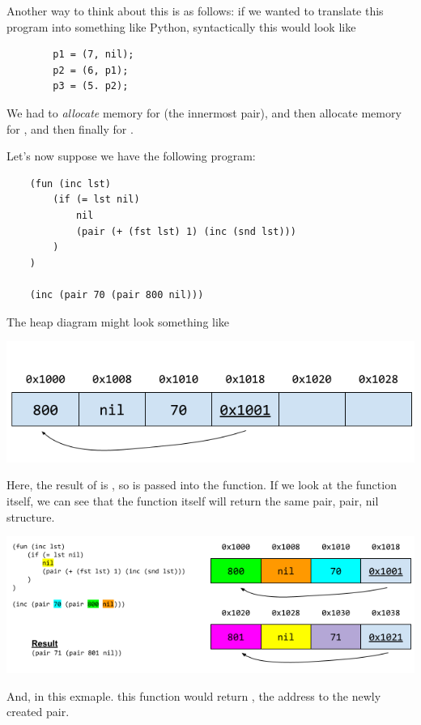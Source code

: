 \begin{mdframed}
    Another way to think about this is as follows: if we wanted to translate this program into something like Python, syntactically this would look like 
    \begin{verbatim}
        p1 = (7, nil);
        p2 = (6, p1);
        p3 = (5. p2);\end{verbatim}
    We had to \emph{allocate} memory for  (the innermost pair), and then allocate memory for , and then finally for .
\end{mdframed}

Let's now suppose we have the following program:
\begin{verbatim}
    (fun (inc lst)
        (if (= lst nil)
            nil
            (pair (+ (fst lst) 1) (inc (snd lst)))
        )
    )

    (inc (pair 70 (pair 800 nil)))\end{verbatim}
The heap diagram might look something like 
\begin{center}
    \includegraphics[scale=0.6]{assets/pair_heap2.png}
\end{center}
Here, the result of  is , so  is passed into the  function. If we look at the function itself, we can see that the function itself will return the same pair, pair, nil structure.
\begin{center}
    \includegraphics[scale=0.73]{assets/pair_heap3.png}
\end{center}
And, in this exmaple. this function would return , the address to the newly created pair.


